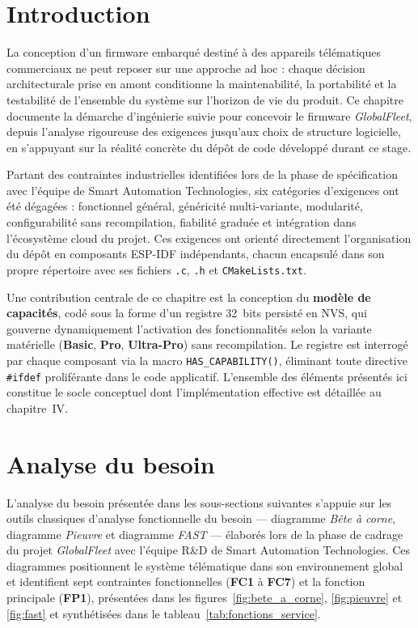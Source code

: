 \newpage

\section{Introduction}
\label{sec:intro_ch3}

La conception d'un firmware embarqué destiné à des appareils
télématiques commerciaux ne peut reposer sur une approche ad hoc :
chaque décision architecturale prise en amont conditionne la
maintenabilité, la portabilité et la testabilité de l'ensemble du
système sur l'horizon de vie du produit. Ce chapitre documente la
démarche d'ingénierie suivie pour concevoir le firmware
\textit{GlobalFleet}, depuis l'analyse rigoureuse des exigences
jusqu'aux choix de structure logicielle, en s'appuyant sur la
réalité concrète du dépôt de code développé durant ce stage.

Partant des contraintes industrielles identifiées lors de la phase de
spécification avec l'équipe de Smart Automation Technologies, six
catégories d'exigences ont été dégagées : fonctionnel général,
généricité multi-variante, modularité, configurabilité sans
recompilation, fiabilité graduée et intégration dans l'écosystème
cloud du projet. Ces exigences ont orienté directement l'organisation
du dépôt en composants ESP-IDF indépendants, chacun encapsulé dans
son propre répertoire avec ses fichiers \texttt{.c}, \texttt{.h} et
\texttt{CMakeLists.txt}.

Une contribution centrale de ce chapitre est la conception du
\textbf{modèle de capacités}, codé sous la forme d'un registre 32~bits
persisté en NVS, qui gouverne dynamiquement l'activation des
fonctionnalités selon la variante matérielle (\textbf{Basic},
\textbf{Pro}, \textbf{Ultra-Pro}) sans recompilation. Le registre est
interrogé par chaque composant via la macro
\texttt{HAS\_CAPABILITY()}, éliminant toute directive
\texttt{\#ifdef} proliférante dans le code applicatif. L'ensemble des
éléments présentés ici constitue le socle conceptuel dont
l'implémentation effective est détaillée au chapitre~IV.

\section{Analyse du besoin}
\label{sec:analyse_besoin}
L'analyse du besoin présentée dans les sous-sections suivantes
s'appuie sur les outils classiques d'analyse fonctionnelle du besoin
— diagramme \textit{Bête à corne}, diagramme \textit{Pieuvre} et
diagramme \textit{FAST} — élaborés lors de la phase de cadrage du
projet \textit{GlobalFleet} avec l'équipe R\&D de Smart Automation
Technologies. Ces diagrammes positionnent le système télématique dans
son environnement global et identifient sept contraintes
fonctionnelles (\textbf{FC1} à \textbf{FC7}) et la fonction principale
(\textbf{FP1}), présentées dans les figures~\ref{fig:bete_a_corne},
\ref{fig:pieuvre} et \ref{fig:fast} et synthétisées dans le
tableau~\ref{tab:fonctions_service}.

